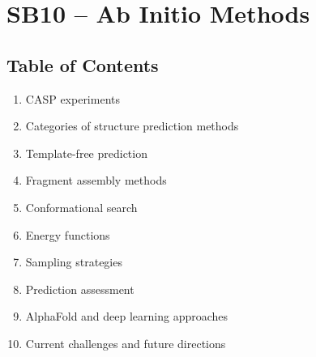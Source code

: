 \section{SB10 -- Ab Initio Methods \done}

\subsection*{Table of Contents}

\begin{enumerate}
\item CASP experiments
\item Categories of structure prediction methods
\item Template-free prediction
\item Fragment assembly methods
\item Conformational search
\item Energy functions
\item Sampling strategies
\item Prediction assessment
\item AlphaFold and deep learning approaches
\item Current challenges and future directions
\end{enumerate}

